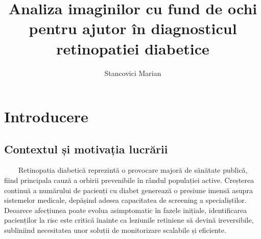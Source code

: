 \documentclass[12pt, a4paper, oneside, romanian]{teza-upb}
\newcommand\blankpage{%
    \null
    \thispagestyle{empty}%
    \addtocounter{page}{-1}
    \newpage}
\begin{document}
\author{Stancovici Marian}

\title{Analiza imaginilor cu fund de ochi pentru ajutor în diagnosticul retinopatiei diabetice}




\beforepreface

\newpage
\mbox{}
\newpage

\listoffigures

\listoftables

\newpage
\mbox{}
\newpage

\afterpreface

\afterpage{\blankpage}

\chapter{Introducere}

\section*{Contextul și motivația lucrării}

\ \ \ \ Retinopatia diabetică reprezintă o provocare majoră de sănătate publică, fiind principala cauză a
orbirii prevenibile în rândul populației active. Creșterea continuă a numărului de pacienți cu diabet
generează o presiune imensă asupra sistemelor medicale, depășind adesea capacitatea de screening a
specialiștilor. Deoarece afecțiunea poate evolua asimptomatic în fazele inițiale, identificarea pacienților
la risc este critică înainte ca leziunile retiniene să devină ireversibile, subliniind necesitatea unor soluții
de monitorizare scalabile și eficiente.
\bigskip
\end{document}
